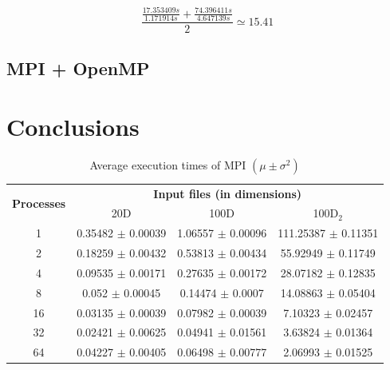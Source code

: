 \documentclass[11pt, journal]{IEEEtran}
\begin{document}
\[ \frac{\frac{17.353409s}{1.171914s} + \frac{74.396411s}{4.647139s}}{2} \simeq 15.41 \]

\subsection{MPI + OpenMP}

\section{Conclusions}




\begin{table}
    \renewcommand{\arraystretch}{1.3}
    \caption{Average execution times of MPI $\left(\mu \pm \sigma^2\right)$}
    \label{mpi_timings_table}
    \centering
    \begin{tabular}{|c||c|c|c|}
    \hline
    \multirow{2}{*}{\textbf{Processes}} & \multicolumn{3}{c|}{\textbf{Input files (in dimensions)}} \\\cline{2-4}
     & 20D & 100D & 100D$_2$ \\
    \hline\hline
    1 & 0.35482 $\pm$ 0.00039 & 1.06557 $\pm$ 0.00096 & 111.25387 $\pm$ 0.11351 \\
    \cline{2-4} 
    2 & 0.18259 $\pm$ 0.00432 & 0.53813 $\pm$ 0.00434 & 55.92949 $\pm$ 0.11749 \\
    \cline{2-4} 
    4 & 0.09535 $\pm$ 0.00171 & 0.27635 $\pm$ 0.00172 & 28.07182 $\pm$ 0.12835 \\
    \cline{2-4} 
    8 & 0.052 $\pm$ 0.00045 & 0.14474 $\pm$ 0.0007 & 14.08863 $\pm$ 0.05404 \\
    \cline{2-4} 
    16 & 0.03135 $\pm$ 0.00039 & 0.07982 $\pm$ 0.00039 & 7.10323 $\pm$ 0.02457 \\
    \cline{2-4} 
    32 & 0.02421 $\pm$ 0.00625 & 0.04941 $\pm$ 0.01561 & 3.63824 $\pm$ 0.01364 \\
    \cline{2-4} 
    64 & 0.04227 $\pm$ 0.00405 & 0.06498 $\pm$ 0.00777 & 2.06993 $\pm$ 0.01525 \\
    \hline
    \end{tabular}
\end{table}
\end{document}
